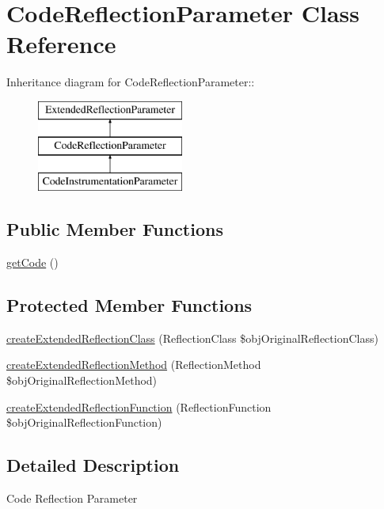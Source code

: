 \hypertarget{class_code_reflection_parameter}{
\section{CodeReflectionParameter Class Reference}
\label{class_code_reflection_parameter}
}
Inheritance diagram for CodeReflectionParameter::\begin{figure}[H]
\begin{center}
\leavevmode
\includegraphics[height=3cm]{class_code_reflection_parameter}
\end{center}
\end{figure}
\subsection*{Public Member Functions}
\begin{CompactItemize}
\item 
\hyperlink{class_code_reflection_parameter_b5e24da53b4a0d0848b18c1e832f47ff}{getCode} ()
\end{CompactItemize}
\subsection*{Protected Member Functions}
\begin{CompactItemize}
\item 
\hyperlink{class_code_reflection_parameter_6b56ec198bc6a5b5a72076e4e7c19e29}{createExtendedReflectionClass} (ReflectionClass \$objOriginalReflectionClass)
\item 
\hyperlink{class_code_reflection_parameter_ec7c1d4b204b6e3a6291d3b867afb688}{createExtendedReflectionMethod} (ReflectionMethod \$objOriginalReflectionMethod)
\item 
\hyperlink{class_code_reflection_parameter_b23ad87d3ac2f376c1a133ca6d27f031}{createExtendedReflectionFunction} (ReflectionFunction \$objOriginalReflectionFunction)
\end{CompactItemize}


\subsection{Detailed Description}
Code Reflection Parameter


